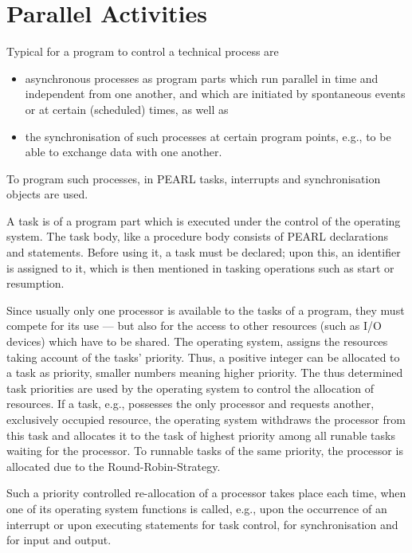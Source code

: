 \chapter{Parallel Activities}  %
\label{sec_parallel_activities}

Typical for a program to control a technical process are
\begin{itemize}
\item asynchronous processes as program parts which run parallel in time 
and independent from one another, and which are initiated by
spontaneous events or at certain (scheduled) times, as well as
\item the synchronisation of such processes at certain program points,
e.g., to be able to exchange data with one another.
\end{itemize}

To program such processes, in PEARL tasks, interrupts and
synchronisation objects are used.

A task is of a program part which is executed under the control of the
operating system. The task body, like a procedure body consists of PEARL 
declarations and statements. Before using it, a task must be declared; 
upon this, an identifier is assigned to it, which is then mentioned 
in tasking operations such as start or resumption.

Since usually only one processor is available to the tasks of a program,
they must compete for its use --- but also for the access to other
resources (such as I/O devices) which have to be shared. The
operating system, assigns the resources taking account of
the tasks' priority. Thus, a positive integer can be allocated to a task
as priority, smaller numbers meaning higher priority. The thus
determined task priorities are used by the operating system to control
the allocation of resources. If a task, e.g., possesses the only
processor and requests another, exclusively occupied resource, the
operating system withdraws the processor from this task and allocates it to
the task of highest priority among all runable  tasks waiting for the
processor. To runnable tasks of the same priority, the processor is
allocated due to the Round-Robin-Strategy.

Such a priority controlled re-allocation of a processor takes place each
time, when one of its operating system functions is called, e.g., upon
the occurrence of an interrupt or upon executing statements for task 
control, for synchronisation and for input and output.

